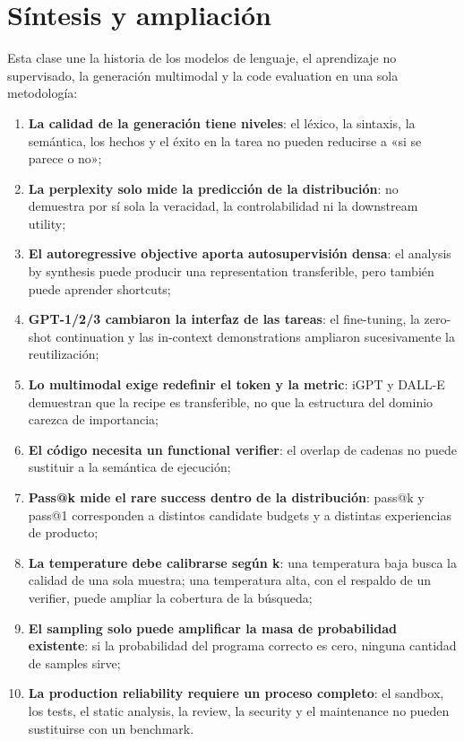 \section{Síntesis y ampliación}

Esta clase une la historia de los modelos de lenguaje, el aprendizaje no supervisado, la generación multimodal y la code evaluation en una sola metodología:

\begin{enumerate}
  \item \textbf{La calidad de la generación tiene niveles}: el léxico, la sintaxis, la semántica, los hechos y el éxito en la tarea no pueden reducirse a «si se parece o no»;
  \item \textbf{La perplexity solo mide la predicción de la distribución}: no demuestra por sí sola la veracidad, la controlabilidad ni la downstream utility;
  \item \textbf{El autoregressive objective aporta autosupervisión densa}: el analysis by synthesis puede producir una representation transferible, pero también puede aprender shortcuts;
  \item \textbf{GPT-1/2/3 cambiaron la interfaz de las tareas}: el fine-tuning, la zero-shot continuation y las in-context demonstrations ampliaron sucesivamente la reutilización;
  \item \textbf{Lo multimodal exige redefinir el token y la metric}: iGPT y DALL-E demuestran que la recipe es transferible, no que la estructura del dominio carezca de importancia;
  \item \textbf{El código necesita un functional verifier}: el overlap de cadenas no puede sustituir a la semántica de ejecución;
  \item \textbf{Pass@k mide el rare success dentro de la distribución}: pass@k y pass@1 corresponden a distintos candidate budgets y a distintas experiencias de producto;
  \item \textbf{La temperature debe calibrarse según k}: una temperatura baja busca la calidad de una sola muestra; una temperatura alta, con el respaldo de un verifier, puede ampliar la cobertura de la búsqueda;
  \item \textbf{El sampling solo puede amplificar la masa de probabilidad existente}: si la probabilidad del programa correcto es cero, ninguna cantidad de samples sirve;
  \item \textbf{La production reliability requiere un proceso completo}: el sandbox, los tests, el static analysis, la review, la security y el maintenance no pueden sustituirse con un benchmark.
\end{enumerate}

